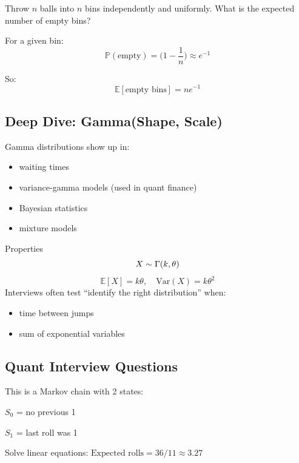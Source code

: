\documentclass{report}
\begin{document}
{
    Throw $n$ balls into $n$ bins independently and uniformly.
What is the expected number of empty bins?

}

\begin{sol}
    For a given bin:
    \[
    \mathbb{P}(\text{empty})=\bigg(1-\frac{1}{n}\bigg)\approx e^{-1}
    \]

    So:
    \[\mathbb{E}[\text{empty bins}]=ne^{-1}\]
\end{sol}

\subsection*{Deep Dive: Gamma(Shape, Scale)}

Gamma distributions show up in:
\begin{itemize}
    \item waiting times
    \item variance-gamma models (used in quant finance)
    \item Bayesian statistics
    \item mixture models
\end{itemize}

Properties
\[
X\sim \Gamma(k,\theta)\\
\]
\[
\mathbb{E}[X]=k\theta, \quad \text{Var}(X)=k\theta^{2}
\]
Interviews often test “identify the right distribution” when:
\begin{itemize}
    \item time between jumps
    \item sum of exponential variables
\end{itemize}

\subsection*{Quant Interview Questions}


\begin{sol}
    
    This is a Markov chain with 2 states:

    $S_0$ = no previous 1

    $S_1$ = last roll was 1

Solve linear equations:
$\text{Expected rolls} = 36/11 \approx 3.27$

\end{sol}
\end{document}
